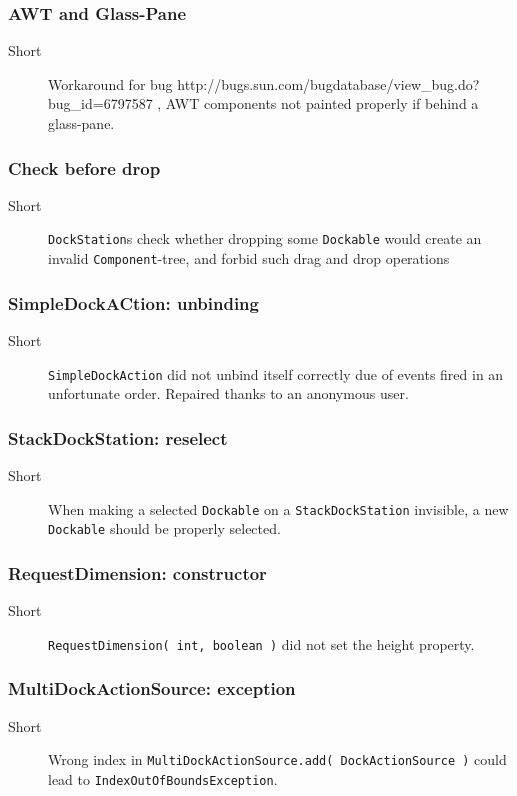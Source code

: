 \documentclass[a4paper,10pt]{article}
\newcommand{\src}[1]{\lstinline[basicstyle=\normalsize\ttfamily,keywordstyle=\normalsize\ttfamily,identifierstyle=\normalsize\ttfamily]|#1|}
\newcommand{\short}{\item[Short]}
\begin{document}
\subsubsection{AWT and Glass-Pane}
\begin{description}
 \short Workaround for bug http://bugs.sun.com/bugdatabase/view_bug.do?bug_id=6797587 , AWT components not painted properly if behind a glass-pane.
\end{description}

\subsubsection{Check before drop}
\begin{description}
 \short \src{DockStation}s check whether dropping some \src{Dockable} would create an invalid \src{Component}-tree, and forbid such drag and drop operations
 \end{description}

\subsubsection{SimpleDockACtion: unbinding}
\begin{description}
 \short \src{SimpleDockAction} did not unbind itself correctly due of events fired in an unfortunate order. Repaired thanks to an anonymous user.
\end{description}

\subsubsection{StackDockStation: reselect}
\begin{description}
 \short When making a selected \src{Dockable} on a \src{StackDockStation} invisible, a new \src{Dockable} should be properly selected.
\end{description}

\subsubsection{RequestDimension: constructor}
\begin{description}
 \short \src{RequestDimension( int, boolean )} did not set the height property.
\end{description}

\subsubsection{MultiDockActionSource: exception}
\begin{description}
 \short Wrong index in \src{MultiDockActionSource.add( DockActionSource )} could lead to \src{IndexOutOfBoundsException}.
\end{description}
\end{document}

